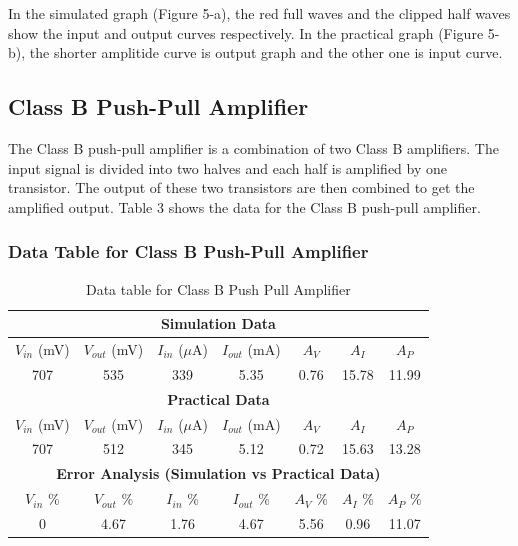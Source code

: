 \documentclass[12pt]{article}
\begin{document}
In the simulated graph (Figure 5-a), the red full waves and the clipped half waves show the input and output curves respectively. In the practical graph (Figure 5-b), the shorter amplitide curve is output graph and the other one is input curve.


\FloatBarrier
\subsection{Class B Push-Pull Amplifier}
The Class B push-pull amplifier is a combination of two Class B amplifiers. The input signal is divided into two halves and each half is amplified by one transistor. The output of these two transistors are then combined to get the amplified output. Table 3 shows the data for the Class B push-pull amplifier.

\subsubsection{Data Table for Class B Push-Pull Amplifier}
\bgroup
\def\arraystretch{1.5}
\begin{table}[h!]
    \centering
    \caption{Data table for Class B Push Pull Amplifier}
    \begin{tabular}{|c|c|c|c|c|c|c|}
        \hline
        \multicolumn{7}{|c|}{\textbf{Simulation Data}} \\
        \hline
        $V_{in}$ (mV) & $V_{out}$ (mV) & $I_{in}$ ($\mu$A) & $I_{out}$ (mA) & $A_V$ & $A_I$ & $A_P$ \\ \hline
        707 & 535 & 339 & 5.35 & 0.76 & 15.78 & 11.99 \\ \hline\hline
        \multicolumn{7}{|c|}{\textbf{Practical Data}} \\
        \hline
        $V_{in}$ (mV) & $V_{out}$ (mV) & $I_{in}$ ($\mu$A) & $I_{out}$ (mA) & $A_V$ & $A_I$ & $A_P$ \\ \hline
        707 & 512 & 345 & 5.12 & 0.72 & 15.63 & 13.28 \\ \hline\hline
        \multicolumn{7}{|c|}{\textbf{Error Analysis (Simulation vs Practical Data)}} \\
        \hline
        $V_{in}$ \% & $V_{out}$ \% & $I_{in}$ \% & $I_{out}$ \% & $A_V$ \% & $A_I$ \% & $A_P$ \% \\ \hline
        0 & 4.67 & 1.76 & 4.67 & 5.56 & 0.96 & 11.07 \\ \hline
    \end{tabular}
\end{table}
\egroup
\end{document}
